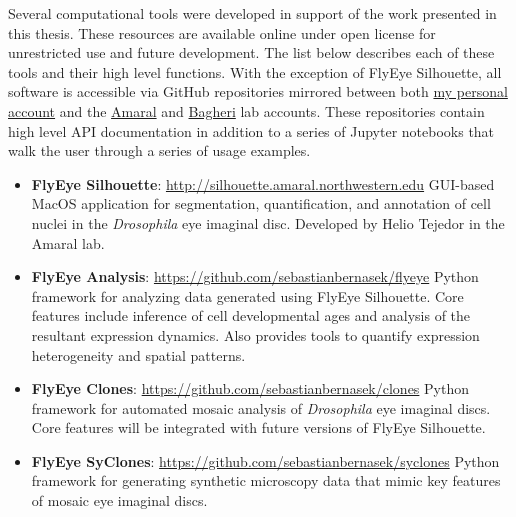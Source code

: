 
Several computational tools were developed in support of the work presented in this thesis. These resources are available online under open license for unrestricted use and future development. The list below describes each of these tools and their high level functions. With the exception of FlyEye Silhouette, all software is accessible via GitHub repositories mirrored between both \href{https://github.com/sebastianbernasek/}{my personal account} and the \href{https://github.com/amarallab}{Amaral} and \href{https://github.com/bagherilab}{Bagheri} lab accounts. These repositories contain high level API documentation in addition to a series of Jupyter notebooks that walk the user through a series of usage examples. 


\begin{itemize}[leftmargin=*,topsep=10pt, itemsep=10pt]
  
  \item \textbf{FlyEye Silhouette}: \url{http://silhouette.amaral.northwestern.edu}
  \newline
  GUI-based MacOS application for segmentation, quantification, and annotation of cell nuclei in the \textit{Drosophila} eye imaginal disc. Developed by Helio Tejedor in the Amaral lab.
  
  \item \textbf{FlyEye Analysis}: \url{https://github.com/sebastianbernasek/flyeye}
  \newline
  Python framework for analyzing data generated using FlyEye Silhouette. Core features include inference of cell developmental ages and analysis of the resultant expression dynamics. Also provides tools to quantify expression heterogeneity and spatial patterns.
  
  \item \textbf{FlyEye Clones}: \url{https://github.com/sebastianbernasek/clones}  
  \newline
  Python framework for automated mosaic analysis of \textit{Drosophila} eye imaginal discs. Core features will be integrated with future versions of FlyEye Silhouette. 
  
  \item \textbf{FlyEye SyClones}: \url{https://github.com/sebastianbernasek/syclones}
  \newline 
  Python framework for generating synthetic microscopy data that mimic key features of mosaic eye imaginal discs.
  

\end{itemize}
